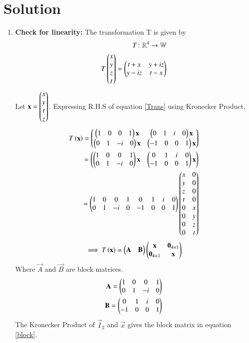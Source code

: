 \documentclass[journal,12pt,twocolumn]{IEEEtran}
\numberwithin{table}{section}
\begin{document}
\section{Solution}
\begin{enumerate}
\item \textbf{Check for linearity:}
The transformation T is given by
\begin{align}
T\colon\mathbb{R}^4\to\mathbb{W}\\
T\begin{pmatrix}x\\y\\z\\t\end{pmatrix}=\begin{pmatrix}t+x&y+iz\\y-iz&t-x\end{pmatrix} \label{Trans}
\end{align}
Let $\mathbf{x}=\begin{pmatrix}x\\y\\t\\z\end{pmatrix}$. Expressing R.H.S of equation \eqref{Trans} using Kronecker Product, 
\begin{align}
T\left(\mathbf{x}\right)=\begin{pmatrix}\begin{pmatrix}1&0&0&1\end{pmatrix}\mathbf{x}&\begin{pmatrix}0&1&i&0\end{pmatrix}\mathbf{x}\\\begin{pmatrix}0&1&-i&0\end{pmatrix}\mathbf{x}&\begin{pmatrix}-1&0&0&1\end{pmatrix}\mathbf{x}\end{pmatrix}\\
=\begin{pmatrix}\begin{pmatrix}1&0&0&1\\0&1&-i&0\end{pmatrix}\mathbf{x}&\begin{pmatrix}0&1&i&0\\-1&0&0&1\end{pmatrix}\mathbf{x}\end{pmatrix}\\
=\begin{pmatrix}1&0&0&1&0&1&i&0\\0&1&-i&0&-1&0&0&1\end{pmatrix}\begin{pmatrix}x&0\\y&0\\z&0\\t&0\\0&x\\0&y\\0&z\\0&t\end{pmatrix}
\end{align}
\begin{align}
\implies T\left(\mathbf{x}\right)=\begin{pmatrix}\mathbf{A}&\mathbf{B}\end{pmatrix}\begin{pmatrix}\mathbf{x}&\mathbf{0}_{4\times1}\\\mathbf{0}_{4\times1}&\mathbf{x}\end{pmatrix}\label{block}
\end{align}
Where $\vec{A}$ and $\vec{B}$ are block matrices.
\begin{align}
\mathbf{A}=\begin{pmatrix}1&0&0&1\\0&1&-i&0\end{pmatrix}\\
\mathbf{B}=\begin{pmatrix}0&1&i&0\\-1&0&0&1\end{pmatrix}
\end{align}
The Kronecker Product of $\vec{I}_2$ and $\vec{x}$ gives the block matrix in equation \eqref{block}.

\end{enumerate}
\end{document}
